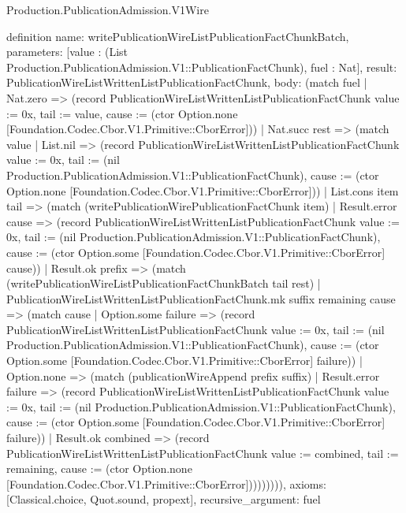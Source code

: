 \begin{lexlean}{Production.PublicationAdmission.V1Wire}
\begin{semanticmodule}
definition{
  name: writePublicationWireListPublicationFactChunkBatch,
  parameters: [value : (List Production.PublicationAdmission.V1::PublicationFactChunk), fuel : Nat],
  result: PublicationWireListWrittenListPublicationFactChunk,
  body: (match fuel
    | Nat.zero => (record PublicationWireListWrittenListPublicationFactChunk {value := 0x, tail := value, cause := (ctor Option.none [Foundation.Codec.Cbor.V1.Primitive::CborError])})
    | Nat.succ rest => (match value
      | List.nil => (record PublicationWireListWrittenListPublicationFactChunk {value := 0x, tail := (nil Production.PublicationAdmission.V1::PublicationFactChunk), cause := (ctor Option.none [Foundation.Codec.Cbor.V1.Primitive::CborError])})
      | List.cons item tail => (match (writePublicationWirePublicationFactChunk item)
        | Result.error cause => (record PublicationWireListWrittenListPublicationFactChunk {value := 0x, tail := (nil Production.PublicationAdmission.V1::PublicationFactChunk), cause := (ctor Option.some [Foundation.Codec.Cbor.V1.Primitive::CborError] cause)})
        | Result.ok prefix => (match (writePublicationWireListPublicationFactChunkBatch tail rest)
          | PublicationWireListWrittenListPublicationFactChunk.mk suffix remaining cause => (match cause
            | Option.some failure => (record PublicationWireListWrittenListPublicationFactChunk {value := 0x, tail := (nil Production.PublicationAdmission.V1::PublicationFactChunk), cause := (ctor Option.some [Foundation.Codec.Cbor.V1.Primitive::CborError] failure)})
            | Option.none => (match (publicationWireAppend prefix suffix)
              | Result.error failure => (record PublicationWireListWrittenListPublicationFactChunk {value := 0x, tail := (nil Production.PublicationAdmission.V1::PublicationFactChunk), cause := (ctor Option.some [Foundation.Codec.Cbor.V1.Primitive::CborError] failure)})
              | Result.ok combined => (record PublicationWireListWrittenListPublicationFactChunk {value := combined, tail := remaining, cause := (ctor Option.none [Foundation.Codec.Cbor.V1.Primitive::CborError])}))))))),
  axioms: [Classical.choice, Quot.sound, propext],
  recursive_argument: fuel
}


\end{semanticmodule}
\end{lexlean}
